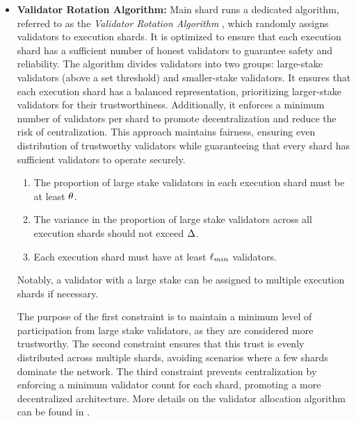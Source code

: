 \begin{itemize}
	\item \textbf{Validator Rotation Algorithm:}
	      Main shard runs a dedicated algorithm, referred to
	      as the
	      \emph{Validator Rotation Algorithm} \cite{rotation},
	      which randomly
	      assigns validators to execution shards. It is
	      optimized to ensure that
	      each execution shard has a sufficient number of
	      honest validators to
	      guarantee safety and reliability.
	      The algorithm divides validators into two groups:
	      large-stake
	      validators (above a set threshold) and smaller-stake
	      validators. It
	      ensures that each execution shard has a balanced
	      representation,
	      prioritizing larger-stake validators for their
	      trustworthiness.
	      Additionally, it enforces a minimum number of
	      validators per shard to
	      promote decentralization and reduce the risk of
	      centralization. This
	      approach maintains fairness, ensuring even
	      distribution of trustworthy
	      validators while guaranteeing that every shard has
	      sufficient validators
	      to operate securely.

	      \begin{enumerate}
		      \item The proportion of large stake validators in
		            each execution shard must be at least
		            $\theta$.
		      \item The variance in the proportion of large
		            stake validators across all execution shards
		            should not exceed
		            $\Delta$.
		      \item Each execution shard must have at least
		            $\ell_{min}$ validators.
	      \end{enumerate}

	      Notably, a validator with a large stake can be assigned to
	      multiple execution shards if necessary.

	      The purpose of the first constraint is to maintain a
	      minimum level of participation from large stake validators,
	      as they are
	      considered more trustworthy. The second constraint ensures
	      that this trust
	      is evenly distributed across multiple shards, avoiding
	      scenarios where a
	      few shards dominate the network. The third constraint
	      prevents
	      centralization by enforcing a minimum validator count for
	      each shard,
	      promoting a more decentralized architecture. More details on
	      the validator
	      allocation algorithm can be found in \cite{}.


\end{itemize}
